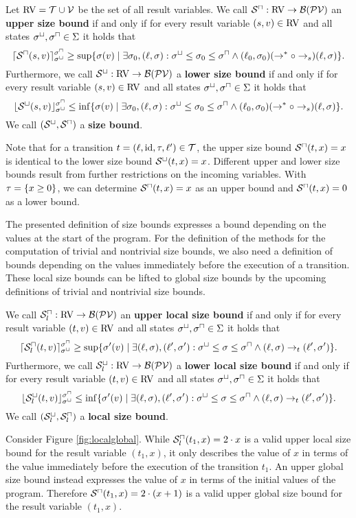 \begin{definition}
  Let $\text{RV} = \mathcal{T} \cup \mathcal{V}$ be the set of all result variables.
  We call ${\mathcal{S}^\sqcap}: \text{RV} \rightarrow \mathcal{B}(\mathcal{PV})$ an \textbf{upper size bound} if and only if for every result variable $(s, v) \in \text{RV}$ and all states ${\sigma^\sqcup}, {\sigma^\sqcap} \in \Sigma$ it holds that
  \[ \lceil {\mathcal{S}^\sqcap}(s, v) \rceil^{{\sigma^\sqcap}}_{{\sigma^\sqcup}} \geq \sup \lbrace  \sigma(v) \mid \exists \sigma_0, (\ell, \sigma): {\sigma^\sqcup} \leq \sigma_0 \leq {\sigma^\sqcap} \wedge (\ell_0, \sigma_0) (\rightarrow^* \circ \rightarrow_s) (\ell, \sigma) \rbrace. \]
  Furthermore, we call ${\mathcal{S}^\sqcup}: \text{RV} \rightarrow \mathcal{B}(\mathcal{PV})$ a \textbf{lower size bound} if and only if for every result variable $(s, v) \in \text{RV}$ and all states ${\sigma^\sqcup}, {\sigma^\sqcap} \in \Sigma$ it holds that
  \[ \lfloor {\mathcal{S}^\sqcup}(s, v) \rfloor^{{\sigma^\sqcap}}_{{\sigma^\sqcup}} \leq \inf \lbrace  \sigma(v) \mid \exists \sigma_0, (\ell, \sigma): {\sigma^\sqcup} \leq \sigma_0 \leq {\sigma^\sqcap} \wedge (\ell_0, \sigma_0) (\rightarrow^* \circ \rightarrow_s) (\ell, \sigma) \rbrace. \]
  We call ${({\mathcal{S}^\sqcup}, {\mathcal{S}^\sqcap})}$ a \textbf{size bound}.
\end{definition}

Note that for a transition $t = (\ell,\text{id},\tau,\ell') \in \mathcal{T}$, the upper size bound ${\mathcal{S}^\sqcap}(t,x) = x$ is identical to the lower size bound ${\mathcal{S}^\sqcup}(t,x) = x$.
Different upper and lower size bounds result from further restrictions on the incoming variables.
With $\tau = \lbrace x \geq 0 \rbrace$, we can determine ${\mathcal{S}^\sqcap}(t,x) = x$ as an upper bound and ${\mathcal{S}^\sqcap}(t,x) = 0$ as a lower bound.

The presented definition of size bounds expresses a bound depending on the values at the start of the program.
For the definition of the methods for the computation of trivial and nontrivial size bounds, we also need a definition of bounds depending on the values immediately before the execution of a transition.
These local size bounds can be lifted to global size bounds by the upcoming definitions of trivial and nontrivial size bounds.

\begin{definition}
  We call ${\mathcal{S}^\sqcap_l}: \text{RV} \rightarrow \mathcal{B}(\mathcal{PV})$ an \textbf{upper local size bound} if and only if for every result variable $(t, v) \in \text{RV}$ and all states ${\sigma^\sqcup}, {\sigma^\sqcap} \in \Sigma$ it holds that
  \[ \lceil {\mathcal{S}^\sqcap_l}(t, v) \rceil^{{\sigma^\sqcap}}_{{\sigma^\sqcup}} \geq \sup \lbrace \sigma'(v) \mid \exists (\ell, \sigma), (\ell', \sigma'): {\sigma^\sqcup} \leq \sigma \leq {\sigma^\sqcap} \wedge (\ell, \sigma) \rightarrow_t (\ell', \sigma') \rbrace. \]
  Furthermore, we call ${\mathcal{S}^\sqcup_l}: \text{RV} \rightarrow \mathcal{B}(\mathcal{PV})$ a \textbf{lower local size bound} if and only if for every result variable $(t, v) \in \text{RV}$ and all states ${\sigma^\sqcup}, {\sigma^\sqcap} \in \Sigma$ it holds that
  \[ \lfloor {\mathcal{S}^\sqcup_l}(t, v) \rfloor^{{\sigma^\sqcap}}_{{\sigma^\sqcup}} \leq \inf \lbrace \sigma'(v) \mid \exists (\ell, \sigma), (\ell', \sigma'): {\sigma^\sqcup} \leq \sigma \leq {\sigma^\sqcap} \wedge (\ell, \sigma) \rightarrow_t (\ell', \sigma') \rbrace. \]
  We call ${({\mathcal{S}^\sqcup_l}, {\mathcal{S}^\sqcap_l})}$ a \textbf{local size bound}.
\end{definition}

\begin{example}
  
  Consider Figure \ref{fig:localglobal}.
  While ${\mathcal{S}^\sqcap_l}(t_1, x) = 2 \cdot x$ is a valid upper local size bound for the result variable $(t_1, x)$, it only describes the value of $x$ in terms of the value immediately before the execution of the transition $t_1$.
  An upper global size bound instead expresses the value of $x$ in terms of the initial values of the program.
  Therefore ${\mathcal{S}^\sqcap}(t_1, x) = 2 \cdot (x + 1)$ is a valid upper global size bound for the result variable $(t_1, x)$.
\end{example}

